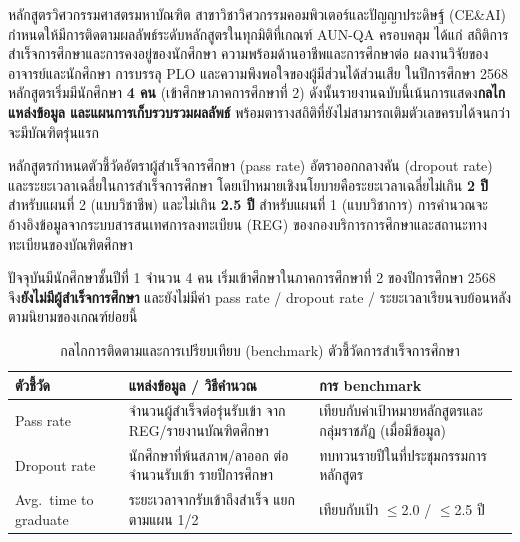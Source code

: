 

หลักสูตรวิศวกรรมศาสตรมหาบัณฑิต สาขาวิชาวิศวกรรมคอมพิวเตอร์และปัญญาประดิษฐ์ (CE\&AI) กำหนดให้มีการติดตามผลลัพธ์ระดับหลักสูตรในทุกมิติที่เกณฑ์ AUN-QA ครอบคลุม ได้แก่ สถิติการสำเร็จการศึกษาและการคงอยู่ของนักศึกษา ความพร้อมด้านอาชีพและการศึกษาต่อ ผลงานวิจัยของอาจารย์และนักศึกษา การบรรลุ PLO และความพึงพอใจของผู้มีส่วนได้ส่วนเสีย ในปีการศึกษา 2568 หลักสูตรเริ่มมีนักศึกษา \textbf{4 คน} (เข้าศึกษาภาคการศึกษาที่ 2) ดังนั้นรายงานฉบับนี้เน้นการแสดง\textbf{กลไก แหล่งข้อมูล และแผนการเก็บรวบรวมผลลัพธ์} พร้อมตารางสถิติที่ยังไม่สามารถเติมตัวเลขครบได้จนกว่าจะมีบัณฑิตรุ่นแรก


หลักสูตรกำหนดตัวชี้วัดอัตราผู้สำเร็จการศึกษา (pass rate) อัตราออกกลางคัน (dropout rate) และระยะเวลาเฉลี่ยในการสำเร็จการศึกษา โดยเป้าหมายเชิงนโยบายคือระยะเวลาเฉลี่ยไม่เกิน \textbf{2 ปี} สำหรับแผนที่ 2 (แบบวิชาชีพ) และไม่เกิน \textbf{2.5 ปี} สำหรับแผนที่ 1 (แบบวิชาการ) การคำนวณจะอ้างอิงข้อมูลจากระบบสารสนเทศการลงทะเบียน (REG) ของกองบริการการศึกษาและสถานะทางทะเบียนของบัณฑิตศึกษา

ปัจจุบันมีนักศึกษาชั้นปีที่ 1 จำนวน 4 คน เริ่มเข้าศึกษาในภาคการศึกษาที่ 2 ของปีการศึกษา 2568 จึง\textbf{ยังไม่มีผู้สำเร็จการศึกษา} และยังไม่มีค่า pass rate / dropout rate / ระยะเวลาเรียนจบย้อนหลังตามนิยามของเกณฑ์ย่อยนี้

\begin{table}[H]
  \centering
  \caption{กลไกการติดตามและการเปรียบเทียบ (benchmark) ตัวชี้วัดการสำเร็จการศึกษา}
  \label{tbl:c8_grad_monitor}
  \begingroup
  \small
  \setlength{\tabcolsep}{3pt}
  \renewcommand{\arraystretch}{1.2}
  \begin{tabularx}{\linewidth}{|>{\raggedright\arraybackslash}p{3.0cm}|Y|>{\raggedright\arraybackslash}p{2.8cm}|}
    \hline
    \textbf{ตัวชี้วัด} & \textbf{แหล่งข้อมูล / วิธีคำนวณ} & \textbf{การ benchmark} \\
    \hline
    Pass rate & จำนวนผู้สำเร็จต่อรุ่นรับเข้า จาก REG/รายงานบัณฑิตศึกษา & เทียบกับค่าเป้าหมายหลักสูตรและกลุ่มราชภัฏ (เมื่อมีข้อมูล) \\
    \hline
    Dropout rate & นักศึกษาที่พ้นสภาพ/ลาออก ต่อจำนวนรับเข้า รายปีการศึกษา & ทบทวนรายปีในที่ประชุมกรรมการหลักสูตร \\
    \hline
    Avg.\ time to graduate & ระยะเวลาจากรับเข้าถึงสำเร็จ แยกตามแผน 1/2 & เทียบกับเป้า $\leq$2.0 / $\leq$2.5 ปี \\
    \hline
  \end{tabularx}
  \endgroup
\end{table}

